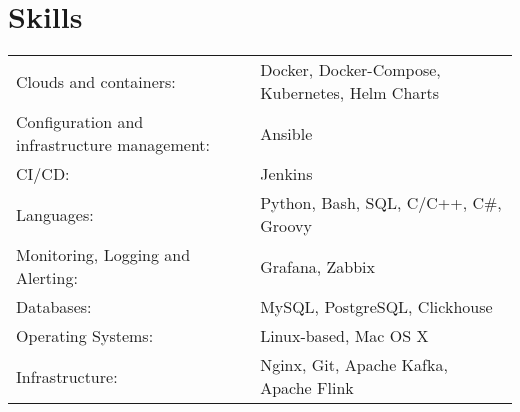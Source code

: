 \documentclass[a4paper,12pt]{article}
\begin{document}
    \section{Skills}
    \begin{tabularx}{\linewidth}{@{}l X@{}}
        Clouds and containers:  &  \normalsize{Docker, Docker-Compose, Kubernetes, Helm Charts}\\
        Configuration and infrastructure management:  &  \normalsize{Ansible}\\
        CI/CD:  &  \normalsize{Jenkins}\\
        Languages:  &  \normalsize{Python, Bash, SQL, C/C++, C\#, Groovy}\\
        Monitoring, Logging and Alerting:  &  \normalsize{Grafana, Zabbix}\\
        Databases:  &  \normalsize{MySQL, PostgreSQL, Clickhouse}\\
        Operating Systems:  &  \normalsize{Linux-based, Mac OS X}\\
        Infrastructure:  &  \normalsize{Nginx, Git, Apache Kafka, Apache Flink}\\
    \end{tabularx}
\end{document}
